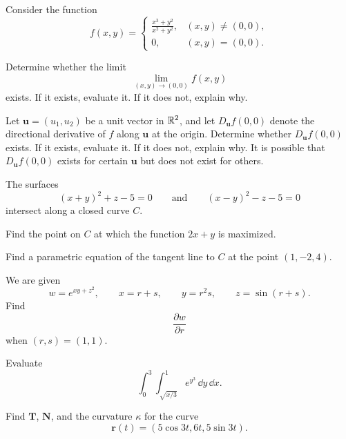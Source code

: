 \begin{problem}
Consider the function
\[
f(x, y)=
\begin{cases}
\displaystyle\frac{x^3+y^2}{x^2+y^2}, & (x, y)\ne(0, 0), \\[0.6em]
0, & (x, y)=(0, 0).
\end{cases}
\]
\begin{problemsubparts}
\item Determine whether the limit
\[
\lim_{(x, y)\to(0, 0)}f(x, y)
\]
exists. If it exists, evaluate it. If it does not, explain why.
\item Let $\mathbf u=(u_1, u_2)$ be a unit vector in $\mathbb{R}^2$, and let $D_{\mathbf u}f(0, 0)$ denote the directional derivative of $f$ along $\mathbf u$ at the origin. Determine whether $D_{\mathbf u}f(0, 0)$ exists. If it exists, evaluate it. If it does not, explain why. It is possible that $D_{\mathbf u}f(0, 0)$ exists for certain $\mathbf u$ but does not exist for others.
\end{problemsubparts}
\end{problem}

\begin{problem}
The surfaces
\[
(x+y)^2+z-5=0
\qquad\text{and}\qquad
(x-y)^2-z-5=0
\]
intersect along a closed curve $C$.
\begin{problemsubparts}
\item Find the point on $C$ at which the function $2x+y$ is maximized.
\item Find a parametric equation of the tangent line to $C$ at the point $(1, -2, 4)$.
\end{problemsubparts}
\end{problem}

\begin{problem}
We are given
\[
w=e^{xy+z^2},
\qquad
x=r+s,
\qquad
y=r^2s,
\qquad
z=\sin(r+s).
\]
Find
\[
\frac{\partial w}{\partial r}
\]
when $(r, s)=(1, 1)$.
\end{problem}

\begin{problem}
Evaluate
\[
\int_0^3\int_{\sqrt{x/3}}^1 e^{y^3}\,\dd y\,\dd x.
\]
\end{problem}

\begin{problem}
Find $\mathbf T$, $\mathbf N$, and the curvature $\kappa$ for the curve
\[
\mathbf r(t)=(5\cos 3t, 6t, 5\sin 3t).
\]
\end{problem}

